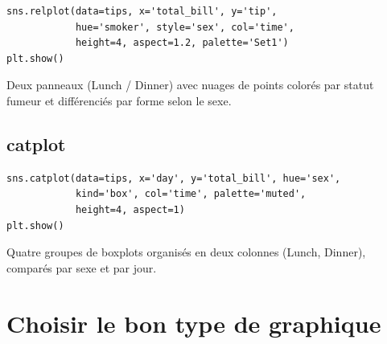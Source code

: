 \begin{codeblock}[title=\textbf{Python}]
\begin{verbatim}
sns.relplot(data=tips, x='total_bill', y='tip',
            hue='smoker', style='sex', col='time',
            height=4, aspect=1.2, palette='Set1')
plt.show()
\end{verbatim}
\end{codeblock}

\begin{codeoutput}
Deux panneaux (Lunch / Dinner) avec nuages de points color\'es par statut fumeur et diff\'erenci\'es par forme selon le sexe.
\end{codeoutput}

\subsection{catplot}

\begin{codeblock}[title=\textbf{Python}]
\begin{verbatim}
sns.catplot(data=tips, x='day', y='total_bill', hue='sex',
            kind='box', col='time', palette='muted',
            height=4, aspect=1)
plt.show()
\end{verbatim}
\end{codeblock}

\begin{codeoutput}
Quatre groupes de boxplots organis\'es en deux colonnes (Lunch, Dinner), compar\'es par sexe et par jour.
\end{codeoutput}

\section{Choisir le bon type de graphique}

